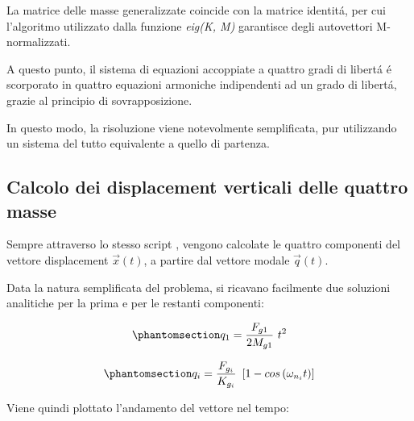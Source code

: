\documentclass{article}
\begin{document}
        La matrice delle masse generalizzate coincide con la matrice identitá, per cui l'algoritmo
        utilizzato dalla funzione \textit{eig(K, M)} garantisce degli autovettori M-normalizzati.

        A questo punto, il sistema di equazioni accoppiate a quattro gradi di libertá é scorporato in quattro equazioni armoniche
        indipendenti ad un grado di libertá, grazie al principio di sovrapposizione. 
        
        In questo modo, 
        la risoluzione viene notevolmente semplificata, pur utilizzando un sistema del tutto equivalente
        a quello di partenza. 

        \clearpage

        \subsection{Calcolo dei displacement verticali delle quattro masse\label{Esercitazione_2_displacement}}

        Sempre attraverso lo stesso script \autocite{Esercitazioni_strutture}, vengono calcolate le quattro componenti
        del vettore displacement $\vec{x}(t)$, a partire dal vettore modale $\vec{q}(t)$.

        Data la natura semplificata del problema, si ricavano facilmente due soluzioni analitiche per la prima e per le restanti componenti:

            \begin{equation}
                \phantomsection \label{equation:q1}
                q_1 = \frac{F_{g1}}{2M_{g1}} \ t^2
            \end{equation}

            \begin{equation}
                \phantomsection \label{equation:q1}
                q_i = \frac{F_{g_i}}{K_{g_i}} \ \left[1 - cos\left(\omega_{n_i} t\right) \right] 
            \end{equation}

        Viene quindi plottato l'andamento del vettore nel tempo:
\end{document}
